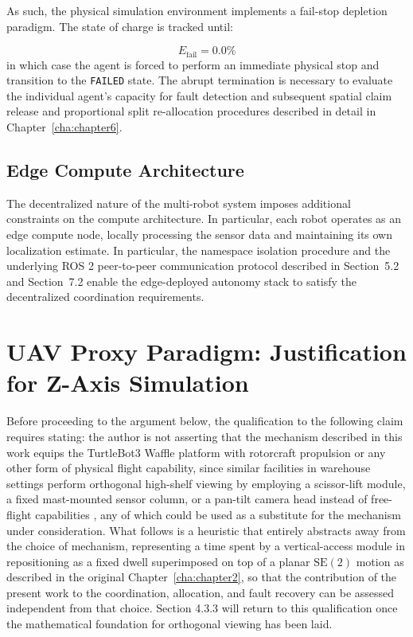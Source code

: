 As such, the physical simulation environment implements a fail-stop depletion paradigm. The state of charge is tracked until:

\begin{equation}
E_{\text{fail}} = 0.0\% \label{eq:absolute_failure_threshold}
\end{equation}
in which case the agent is forced to perform an immediate physical stop and transition to the \texttt{FAILED} state. The abrupt termination is necessary to evaluate the individual agent's capacity for fault detection and subsequent spatial claim release and proportional split re-allocation procedures described in detail in Chapter~\ref{cha:chapter6}.

\subsection{Edge Compute Architecture}

The decentralized nature of the multi-robot system imposes additional constraints on the compute architecture. In particular, each robot operates as an edge compute node, locally processing the sensor data and maintaining its own localization estimate. In particular, the namespace isolation procedure and the underlying ROS 2 peer-to-peer communication protocol described in Section~5.2 and Section~7.2 enable the edge-deployed autonomy stack to satisfy the decentralized coordination requirements.

\section{UAV Proxy Paradigm: Justification for Z-Axis Simulation}\label{sec:ch4_uav_proxy}

Before proceeding to the argument below, the qualification to the following claim requires stating: the author is not asserting that the mechanism described in this work equips the TurtleBot3 Waffle platform with rotorcraft propulsion or any other form of physical flight capability, since similar facilities in warehouse settings perform orthogonal high-shelf viewing by employing a scissor-lift module, a fixed mast-mounted sensor column, or a pan-tilt camera head instead of free-flight capabilities \cite{tsiakas2024autonomous}, any of which could be used as a substitute for the mechanism under consideration. What follows is a heuristic that entirely abstracts away from the choice of mechanism, representing a time spent by a vertical-access module in repositioning as a fixed dwell superimposed on top of a planar $\text{SE}(2)$ motion as described in the original Chapter~\ref{cha:chapter2}, so that the contribution of the present work to the coordination, allocation, and fault recovery can be assessed independent from that choice. Section 4.3.3 will return to this qualification once the mathematical foundation for orthogonal viewing has been laid.

